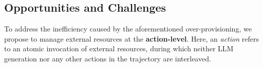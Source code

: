 
\subsection{Opportunities and Challenges}
\label{sec:background_opp}

To address the inefficiency caused by the aforementioned over-provisioning, we propose to manage external resources at the \textbf{action-level}. 
Here, an \textit{action} refers to an atomic invocation of external resources, during which neither LLM generation nor any other actions in the trajectory are interleaved.

